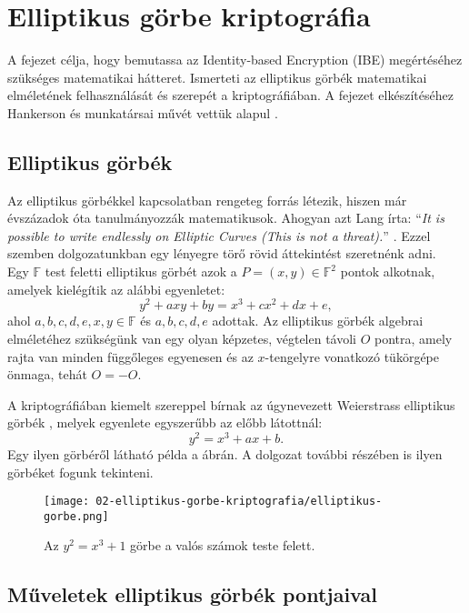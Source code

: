 \chapter{Elliptikus görbe kriptográfia}
\label{Chapter::ECC}

A fejezet célja, hogy bemutassa az Identity-based Encryption (IBE) megértéséhez szükséges matematikai hátteret. Ismerteti az elliptikus görbék matematikai elméletének felhasználását és szerepét a kriptográfiában. A fejezet elkészítéséhez Hankerson és munkatársai művét vettük alapul \citeyear{GuideToEllipticCurveCryptography}.

\section{Elliptikus görbék}

Az elliptikus görbékkel kapcsolatban rengeteg forrás létezik, hiszen már évszázadok óta tanulmányozzák matematikusok. Ahogyan azt Lang írta: \enquote{\textit{It is possible to write endlessly on Elliptic Curves (This is not a threat).}} \citeyear{Lang::EllipticCurve}. Ezzel szemben dolgozatunkban egy lényegre törő rövid áttekintést szeretnénk adni.
\\

Egy $\mathbb{F}$ test feletti elliptikus görbét azok a $P = (x, y) \in \mathbb{F}^2$ pontok alkotnak, amelyek kielégítik az alábbi egyenletet: $$y^2 + axy + by = x^3 + cx^2 + dx + e,$$ ahol $a, b, c, d, e, x, y \in \mathbb{F}$ és $a, b, c, d, e$ adottak. Az elliptikus görbék algebrai elméletéhez szükségünk van egy olyan képzetes, végtelen távoli $O$ pontra, amely rajta van minden függőleges egyenesen és az $x$-tengelyre vonatkozó tükörgépe önmaga, tehát $O = -O$.

A kriptográfiában kiemelt szereppel bírnak az úgynevezett Weierstrass elliptikus görbék \cite{Kobitz::ECC}, melyek egyenlete egyszerűbb az előbb látottnál: $$y^2 = x^3 + ax + b.$$ Egy ilyen görbéről látható példa a  ábrán. A dolgozat további részében is ilyen görbéket fogunk tekinteni.

\begin{figure}[H]
    \centering
    \texttt{[image: 02-elliptikus-gorbe-kriptografia/elliptikus-gorbe.png]}
    \caption{Az $y^2 = x^3 + 1$ görbe a valós számok teste felett.}
    \label{Figure::ECC::EllipticCurve}
\end{figure}

\section{Műveletek elliptikus görbék pontjaival}

